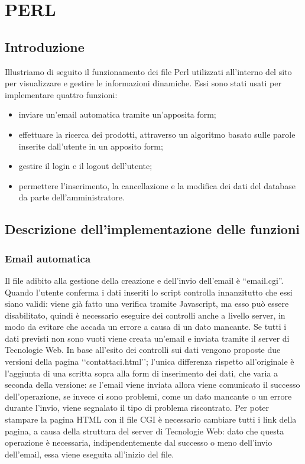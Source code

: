 \section{PERL}{
	\subsection{Introduzione}{
			Illustriamo di seguito il funzionamento dei file Perl utilizzati all'interno del sito per visualizzare e gestire le informazioni dinamiche. Essi sono stati usati per implementare quattro funzioni:
			\begin{itemize}
				\item inviare un'email automatica tramite un'apposita form;
				\item effettuare la ricerca dei prodotti, attraverso un algoritmo basato sulle parole inserite dall'utente in un apposito form;
				\item gestire il login e il logout dell'utente;
				\item permettere l'inserimento, la cancellazione e la modifica dei dati del database da parte dell'amministratore.
			\end{itemize}
	}
	\subsection{Descrizione dell'implementazione delle funzioni}{
		\subsubsection{Email automatica}
			Il file adibito alla gestione della creazione e dell'invio dell'email è ``email.cgi''. Quando l'utente conferma i dati inseriti lo script controlla innanzitutto che essi siano validi: viene già fatto una verifica tramite Javascript, ma esso può essere disabilitato, quindi è necessario eseguire dei controlli anche a livello server, in modo da evitare che accada un errore a causa di un dato mancante. Se tutti i dati previsti non sono vuoti viene creata un'email e inviata tramite il server di Tecnologie Web.
			In base all'esito dei controlli sui dati vengono proposte due versioni della pagina ‘‘contattaci.html’’; l'unica differenza rispetto all'originale è l'aggiunta di una scritta sopra alla form di inserimento dei dati, che varia a seconda della versione: se l'email viene inviata allora viene comunicato il successo dell'operazione, se invece ci sono problemi, come un dato mancante o un errore durante l'invio, viene segnalato il tipo di problema riscontrato. Per poter stampare la pagina HTML con il file CGI è necessario cambiare tutti i link della pagina, a causa della struttura del server di Tecnologie Web: dato che questa operazione è necessaria, indipendentemente dal successo o meno dell'invio dell'email, essa viene eseguita all'inizio del file.
}}

